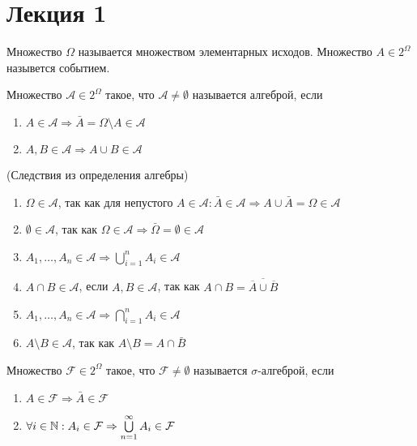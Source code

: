 \documentclass[a4paper, 12pt]{article}
\begin{document}
\section{Лекция 1}
\begin{definition}
    Множество $\Omega$ называется множеством элементарных исходов. Множество $A\in 2^{\Omega}$ назывется событием.
\end{definition}
\begin{definition}
    Множество $\mathcal{A}\in 2^{\Omega}$ такое, что $\mathcal{A}\ne \emptyset$ называется алгеброй, если
    \begin{enumerate}
        \item $A\in \mathcal{A} \Rightarrow \bar{A}=\Omega\setminus A\in \mathcal{A}$
        \item $A,B\in \mathcal{A} \Rightarrow A\cup B\in \mathcal{A}$
    \end{enumerate}
\end{definition}
\begin{statement} (Следствия из определения алгебры)
    \begin{enumerate}
        \item $\Omega\in \mathcal{A}$, так как для непустого $A\in \mathcal{A}: \bar{A}\in \mathcal{A} \Rightarrow A\cup\bar{A}=\Omega\in \mathcal{A}$
        \item $\emptyset\in \mathcal{A}$, так как $\Omega\in \mathcal{A} \Rightarrow \bar{\Omega}=\emptyset\in \mathcal{A}$
        \item $A_1,\dots,A_n \in \mathcal{A} \Rightarrow \bigcup\limits_{i=1}^n A_i\in \mathcal{A}$
        \item $A\cap B\in \mathcal{A}$, если $A,B\in \mathcal{A}$, так как $A\cap B=\overline{\overline{A}\cup\overline{B}}$
        \item $A_1,\dots,A_n \in \mathcal{A} \Rightarrow \bigcap\limits_{i=1}^n A_i\in \mathcal{A}$
        \item $A\setminus B\in \mathcal{A}$, так как $A\setminus B=A\cap \bar{B}$
    \end{enumerate}
\end{statement}
\begin{definition}
    Множество $\mathcal{F}\in 2^{\Omega}$ такое, что $\mathcal{F}\ne \emptyset$ называется $\sigma$-алгеброй, если
    \begin{enumerate}
        \item $A\in \mathcal{F} \Rightarrow \bar{A}\in \mathcal{F}$
        \item $\forall i\in \mathbb{N}: A_i\in \mathcal{F} \Rightarrow \bigcup\limits_{n=1}^{\infty}A_i\in \mathcal{F}$
    \end{enumerate} 
\end{definition}
\end{document}
